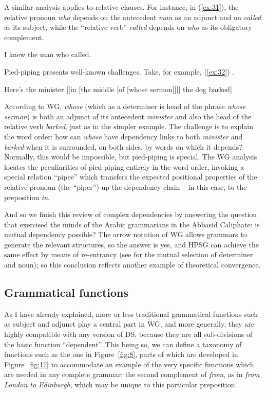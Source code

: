 \documentclass[output=paper
 	        ,biblatex
                ,babelshorthands
                ,newtxmath
                ,draftmode
                ,colorlinks, citecolor=brown
]{langscibook}
\begin{document}
A similar analysis applies to relative clauses. For instance, in (\ref{ex:31}), the relative pronoun \emph{who} depends on the antecedent \emph{man} as an adjunct and on \emph{called} as its subject, while the ``relative verb'' \emph{called} depends on \emph{who} as its obligatory complement.

\begin{exe}
	\ex \label{ex:31} I knew the man who called.
\end{exe}

Pied-piping presents well-known challenges. Take, for example, (\ref{ex:32}) \citep[212]{ps2}.

\begin{exe}
	\ex \label{ex:32} Here's the minister [[in [the middle [of [whose sermon]]]] the dog barked]
\end{exe}

\noindent
According to WG, \emph{whose} (which as a determiner is head of the phrase \emph{whose sermon}) is both an adjunct of its antecedent \emph{minister} and also the head of the relative verb \emph{barked}, just as in the simpler example. The challenge is to explain the word order: how can \emph{whose} have dependency links to both \emph{minister} and \emph{barked} when it is surrounded, on both sides, by words on which it depends? Normally, this would be impossible, but pied-piping is special. The WG analysis \citep{Hudson2018a} locates the peculiarities of pied-piping entirely in the word order, invoking a special relation ``pipee'' which transfers the expected positional properties of the relative pronoun (the ``piper'') up the dependency chain – in this case, to the preposition \emph{in}.

And so we finish this review of complex dependencies by answering the question that exercised the
minds of the Arabic grammarians in the Abbasid Ca\-liph\-ate: is mutual dependency possible?
The arrow notation of WG allows grammars to generate the relevant structures, so the answer is yes,
and HPSG can achieve the same effect by means of re-entrancy (see
   for the mutual selection of determiner and noun); so this conclusion reflects
another example of theoretical convergence.


\subsection{Grammatical functions}
\label{sec:5.3}

As I have already explained, more or less traditional grammatical functions such as subject and
adjunct play a central part in WG, and more generally, they are highly compatible with any version
of DS, because they are all sub-divisions of the basic function ``dependent''. This being so, we can
define a taxonomy of functions such as the one in Figure~\ref{fig:8}, parts of which are developed in Figure~\ref{fig:17} to accommodate an example of the very specific functions which are needed in any complete grammar: the second complement of \emph{from}, as in \emph{from London to Edinburgh}, which may be unique to this particular preposition.
\end{document}
